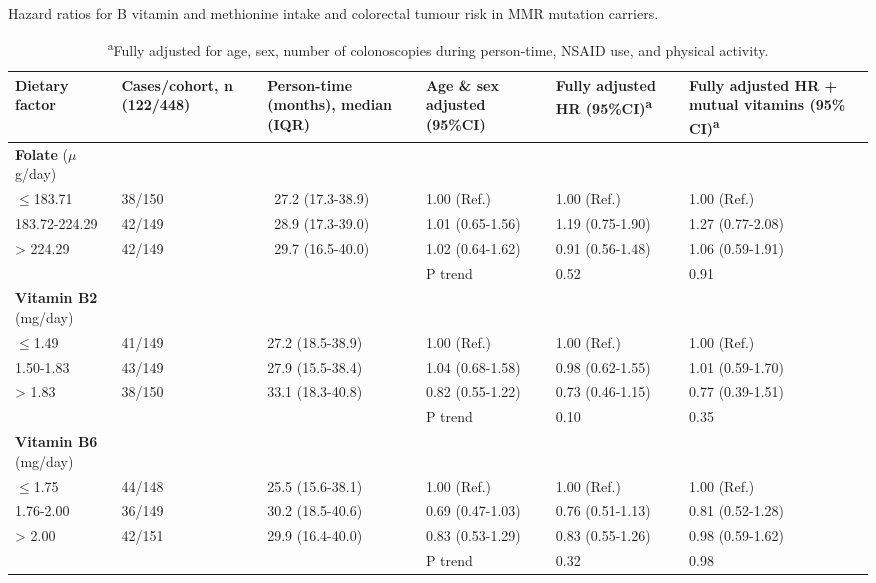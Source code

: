 \begin{sidewaystable}
\caption{Hazard ratios for B vitamin and methionine intake and colorectal tumour risk in MMR mutation carriers.}
\label{table6_2}
\begin{adjustbox}{width=\textwidth}
\begin{tabular}{L{2.7cm}C{2.5cm}C{3.1cm}C{3.1cm}C{3.1cm}C{3.1cm}}
\hline
\parbox[c][1.7cm]{2.7cm}{\centering \textbf{Dietary factor}} &
\parbox[c][1.7cm]{2.5cm}{\centering \textbf{Cases/cohort, n (122/448)}} &
\parbox[c][1.7cm]{3.1cm}{\centering \textbf{Person-time (months), median (IQR)}} &
\parbox[c][1.7cm]{3.1cm}{\centering \textbf{Age \& sex adjusted (95\%CI)}} &
\parbox[c][1.7cm]{3.1cm}{\centering \textbf{Fully adjusted HR (95\%CI)}{\textsuperscript{a}}} &
\parbox[c][1.7cm]{3.1cm}{\centering \textbf{Fully adjusted HR + mutual vitamins (95\% CI)}{\textsuperscript{a}}}\\
\hline
{\textbf{Folate}}{ ($\mu$g/day)} & ~ & ~ & ~ & ~ & ~ \\
{\textrm{${\leq}$}}{183.71} & 38/150 & \ 27.2 (17.3-38.9) & 1.00 (Ref.) & 1.00 (Ref.) & 1.00 (Ref.)\\
183.72-224.29 & 42/149 & \ 28.9 (17.3-39.0) & 1.01 (0.65-1.56) & 1.19 (0.75-1.90) & 1.27 (0.77-2.08)\\
{\textgreater} 224.29 & 42/149 & \ 29.7 (16.5-40.0) & 1.02 (0.64-1.62) & 0.91 (0.56-1.48) & 1.06 (0.59-1.91)\\ ~ & ~ & ~ & P trend & 0.52 & 0.91\\

{\textbf{Vitamin B2}}{ (mg/day)} & ~ & ~ & ~ & ~ & ~ \\
{\textrm{${\leq}$}}{1.49} & 41/149 & 27.2 (18.5-38.9) & 1.00 (Ref.) & 1.00 (Ref.) & 1.00 (Ref.)\\
1.50-1.83 & 43/149 & 27.9 (15.5-38.4) & 1.04 (0.68-1.58) & 0.98 (0.62-1.55) & 1.01 (0.59-1.70)\\
{\textgreater} 1.83 & 38/150 & 33.1 (18.3-40.8) & 0.82 (0.55-1.22) & 0.73 (0.46-1.15) & 0.77 (0.39-1.51)\\ ~ & ~ & ~ & P trend & 0.10 & 0.35\\

{\textbf{Vitamin B6}}{ (mg/day)} & ~ & ~ & ~ & ~ & ~ \\
{\textrm{${\leq}$}}{1.75} & 44/148 & 25.5 (15.6-38.1) & 1.00 (Ref.) & 1.00 (Ref.) & 1.00 (Ref.)\\
1.76-2.00 & 36/149 & 30.2 (18.5-40.6) & 0.69 (0.47-1.03) & 0.76 (0.51-1.13) & 0.81 (0.52-1.28)\\
{\textgreater} 2.00 & 42/151 & 29.9 (16.4-40.0) & 0.83 (0.53-1.29) & 0.83 (0.55-1.26) & 0.98 (0.59-1.62)\\ ~ & ~ & ~ & P trend & 0.32 & 0.98\\
\hline
\end{tabular}
\end{adjustbox}
\caption*{\footnotesize{\textsuperscript{a}Fully adjusted for age, sex, number of colonoscopies during person-time, NSAID use, and physical activity.}}
\end{sidewaystable}

